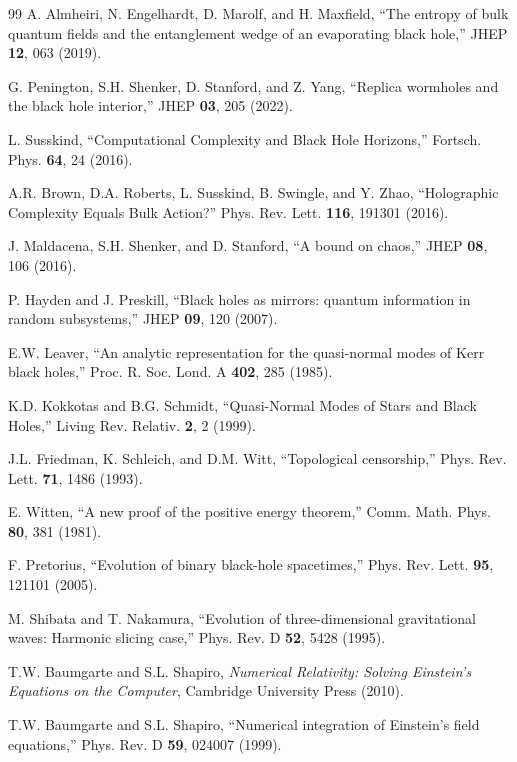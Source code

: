 \documentclass[12pt,a4paper]{article}
\begin{document}
\begin{thebibliography}{99}
A. Almheiri, N. Engelhardt, D. Marolf, and H. Maxfield, ``The entropy of bulk quantum fields and the entanglement wedge of an evaporating black hole,'' JHEP \textbf{12}, 063 (2019).

G. Penington, S.H. Shenker, D. Stanford, and Z. Yang, ``Replica wormholes and the black hole interior,'' JHEP \textbf{03}, 205 (2022).

L. Susskind, ``Computational Complexity and Black Hole Horizons,'' Fortsch. Phys. \textbf{64}, 24 (2016).

A.R. Brown, D.A. Roberts, L. Susskind, B. Swingle, and Y. Zhao, ``Holographic Complexity Equals Bulk Action?'' Phys. Rev. Lett. \textbf{116}, 191301 (2016).

J. Maldacena, S.H. Shenker, and D. Stanford, ``A bound on chaos,'' JHEP \textbf{08}, 106 (2016).

P. Hayden and J. Preskill, ``Black holes as mirrors: quantum information in random subsystems,'' JHEP \textbf{09}, 120 (2007).

E.W. Leaver, ``An analytic representation for the quasi-normal modes of Kerr black holes,'' Proc. R. Soc. Lond. A \textbf{402}, 285 (1985).

K.D. Kokkotas and B.G. Schmidt, ``Quasi-Normal Modes of Stars and Black Holes,'' Living Rev. Relativ. \textbf{2}, 2 (1999).

J.L. Friedman, K. Schleich, and D.M. Witt, ``Topological censorship,'' Phys. Rev. Lett. \textbf{71}, 1486 (1993).

E. Witten, ``A new proof of the positive energy theorem,'' Comm. Math. Phys. \textbf{80}, 381 (1981).

F. Pretorius, ``Evolution of binary black-hole spacetimes,'' Phys. Rev. Lett. \textbf{95}, 121101 (2005).

M. Shibata and T. Nakamura, ``Evolution of three-dimensional gravitational waves: Harmonic slicing case,'' Phys. Rev. D \textbf{52}, 5428 (1995).

T.W. Baumgarte and S.L. Shapiro, \textit{Numerical Relativity: Solving Einstein's Equations on the Computer}, Cambridge University Press (2010).

T.W. Baumgarte and S.L. Shapiro, ``Numerical integration of Einstein's field equations,'' Phys. Rev. D \textbf{59}, 024007 (1999).


\end{thebibliography}
\end{document}
